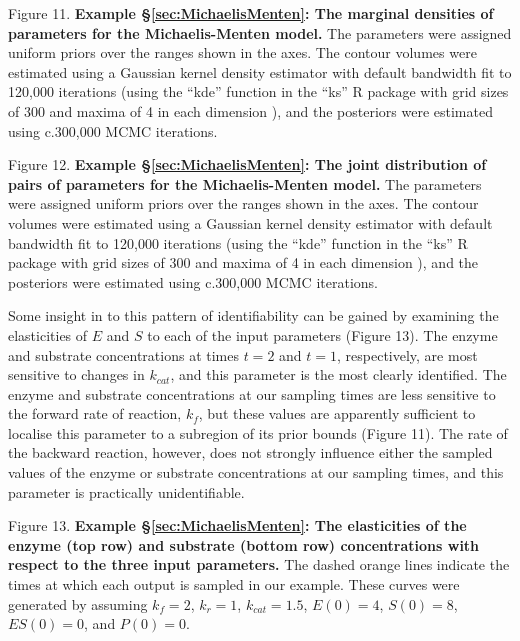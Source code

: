\documentclass[10pt,letterpaper]{article}
\begin{document}
\vspace{0.5cm}

Figure 11. {\bf Example \S \ref{sec:MichaelisMenten}: The marginal densities of parameters for the Michaelis-Menten model.} The parameters were assigned uniform priors over the ranges shown in the axes. The contour volumes were estimated using a Gaussian kernel density estimator with default bandwidth fit to 120,000 iterations (using the ``kde'' function in the ``ks'' R \cite{RLanguage} package with grid sizes of 300 and maxima of 4 in each dimension \cite{duong2018package}), and the posteriors were estimated using c.300,000 MCMC iterations.

\vspace{0.5cm}

Figure 12. {\bf Example \S \ref{sec:MichaelisMenten}: The joint distribution of pairs of parameters for the Michaelis-Menten model.} The parameters were assigned uniform priors over the ranges shown in the axes. The contour volumes were estimated using a Gaussian kernel density estimator with default bandwidth fit to 120,000 iterations (using the ``kde'' function in the ``ks'' R \cite{RLanguage} package with grid sizes of 300 and maxima of 4 in each dimension \cite{duong2018package}), and the posteriors were estimated using c.300,000 MCMC iterations.

\vspace{0.5cm}

Some insight in to this pattern of identifiability can be gained by examining the elasticities of $E$ and $S$ to each of the input parameters (Figure 13). The enzyme and substrate concentrations at times $t=2$ and $t=1$, respectively, are most sensitive to changes in $k_{cat}$, and this parameter is the most clearly identified. The enzyme and substrate concentrations at our sampling times are less sensitive to the forward rate of reaction, $k_f$, but these values are apparently sufficient to localise this parameter to a subregion of its prior bounds (Figure 11). The rate of the backward reaction, however, does not strongly influence either the sampled values of the enzyme or substrate concentrations at our sampling times, and this parameter is practically unidentifiable.

\vspace{0.5cm}

Figure 13. {\bf Example \S \ref{sec:MichaelisMenten}: The elasticities of the enzyme (top row) and substrate (bottom row) concentrations with respect to the three input parameters.} The dashed orange lines indicate the times at which each output is sampled in our example. These curves were generated by assuming $k_f = 2$, $k_r = 1$, $k_{cat} = 1.5$, $E(0) = 4$, $S(0) = 8$, $ES(0) = 0$, and $P(0) = 0$.
\end{document}
